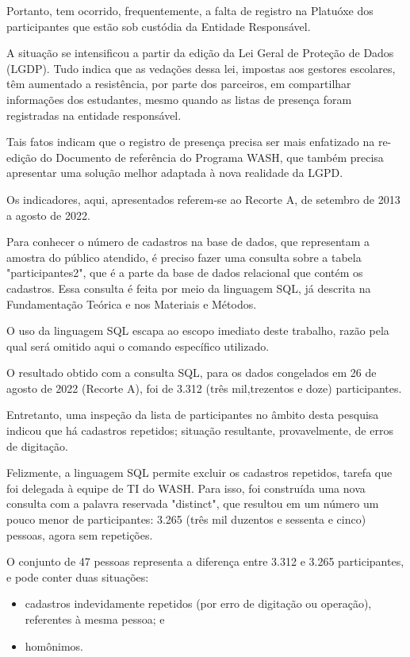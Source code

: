 Portanto, tem ocorrido, frequentemente, a falta de registro na Platuóxe dos participantes que estão sob custódia da Entidade Responsável.

A situação se intensificou a partir da edição da Lei Geral de Proteção de Dados (LGDP). Tudo indica que as vedações dessa lei, impostas aos gestores escolares, têm aumentado a resistência, por parte dos parceiros, em compartilhar informações dos estudantes, mesmo quando as listas de presença foram registradas na entidade responsável.

Tais fatos indicam que o registro de presença precisa ser mais enfatizado na re-edição do Documento de referência do Programa WASH, que também precisa apresentar uma solução melhor adaptada à nova realidade da LGPD.

Os indicadores, aqui, apresentados referem-se ao Recorte A, de setembro de 2013 a agosto de 2022.

Para conhecer o número de cadastros na base de dados, que representam a amostra do público atendido, é preciso fazer uma consulta sobre a tabela "participantes2", que é a parte da base de dados relacional que contém os cadastros. Essa consulta é feita por meio da linguagem SQL, já descrita na Fundamentação Teórica e nos Materiais e Métodos.

O uso da linguagem SQL escapa ao escopo imediato deste trabalho, razão pela qual será omitido aqui o comando específico utilizado.

O resultado obtido com a consulta SQL, para os dados congelados em 26 de agosto de 2022 (Recorte A), foi de 3.312 (três mil,trezentos e doze) participantes.

Entretanto, uma inspeção da lista de participantes no âmbito desta pesquisa indicou que há cadastros repetidos; situação resultante, provavelmente, de erros de digitação.

Felizmente, a linguagem SQL permite excluir os cadastros repetidos, tarefa que foi delegada à equipe de TI do WASH. Para isso, foi construída uma nova consulta com a palavra reservada "distinct", que resultou em um número um pouco menor de participantes: 3.265 (três mil duzentos e sessenta e cinco) pessoas, agora sem repetições.

O conjunto de 47 pessoas representa a diferença entre 3.312 e 3.265 participantes, e pode conter duas situações:


\begin{itemize}
\item cadastros indevidamente repetidos (por erro de digitação ou operação), referentes à mesma pessoa; e
\item homônimos.
\end{itemize}

